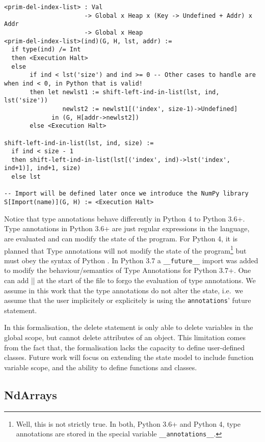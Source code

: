 \begin{verbatim}
<prim-del-index-list> : Val
                      -> Global x Heap x (Key -> Undefined + Addr) x Addr
                      -> Global x Heap
<prim-del-index-list>(ind)(G, H, lst, addr) :=
  if type(ind) /= Int
  then <Execution Halt>
  else
       if ind < lst('size') and ind >= 0 -- Other cases to handle are when ind < 0, in Python that is valid!
       then let newlst1 := shift-left-ind-in-list(lst, ind, lst('size'))
                newlst2 := newlst1[('index', size-1)->Undefined]
             in (G, H[addr->newlst2])
       else <Execution Halt>

shift-left-ind-in-list(lst, ind, size) :=
  if ind < size - 1
  then shift-left-ind-in-list(lst[('index', ind)->lst('index', ind+1)], ind+1, size)
  else lst

-- Import will be defined later once we introduce the NumPy library
S[Import(name)](G, H) := <Execution Halt>
\end{verbatim}

Notice that type annotations behave differently in Python 4 to Python
3.6+. Type annotations in Python 3.6+ are just regular expressions in
the language, are evaluated and can modify the state of the program. For
Python 4, it is planned that Type annotations will not modify the state
of the program\footnote{Well, this is not strictly true. In both, Python
  3.6+ and Python 4, type annotations are stored in the special variable
  \texttt{\_\_annotations\_\_}. {}} but must obey the syntax of Python {}. In Python 3.7 a \texttt{\_\_future\_\_} import was added to
modify the behaviour/semantics of Type Annotations for Python 3.7+. One
can add
\VERB||
at the start of the file to forgo the evaluation of type annotations. We
assume in this work that the type annotations do not alter the state,
i.e.~we assume that the user implicitely or explicitely is using the
\texttt{annotations}' future statement.

In this formalisation, the delete statement is only able to delete
variables in the global scope, but cannot delete attributes of an
object. This limitation comes from the fact that, the formalisation
lacks the capacity to define user-defined classes. Future work will
focus on extending the state model to include function variable scope,
and the ability to define functions and classes.

\subsection{NdArrays}\label{ndarrays}

